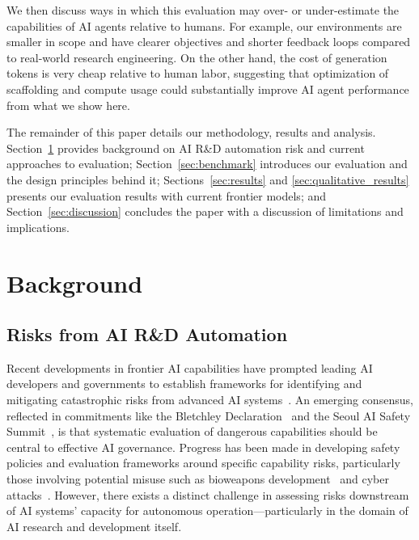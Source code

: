 \documentclass{article}
\begin{document}
We then discuss ways in which this evaluation may over- or under-estimate the capabilities of AI agents relative to humans. For example, our environments are smaller in scope and have clearer objectives and shorter feedback loops compared to real-world research engineering. On the other hand, the cost of generation tokens is very cheap relative to human labor, suggesting that optimization of scaffolding and compute usage could substantially improve AI agent performance from what we show here.


The remainder of this paper details our methodology, results and analysis. Section~\ref{sec:background} provides background on AI R\&D automation risk and current approaches to evaluation; Section~\ref{sec:benchmark} introduces our evaluation and the design principles behind it; Sections~\ref{sec:results} and  \ref{sec:qualitative_results} presents our evaluation results with current frontier models; and Section~\ref{sec:discussion} concludes the paper with a discussion of limitations and implications. 

\section{Background}
\label{sec:background}

\subsection{Risks from AI R\&D Automation}
\label{subsec:risks}

Recent developments in frontier AI capabilities have prompted leading AI developers and governments to establish frameworks for identifying and mitigating catastrophic risks from advanced AI systems~\cite{anthropic2024rsp,deepmind2024frontier,openai2023preparedness}. 
An emerging consensus, reflected in commitments like the Bletchley Declaration~\cite{bletchley2023} and the Seoul AI Safety Summit~\cite{UK_GOV_Frontier_AI_Safety_2024}, is that systematic evaluation of dangerous capabilities should be central to effective AI governance. 
Progress has been made in developing safety policies and evaluation frameworks around specific capability risks, particularly those involving potential misuse such as bioweapons development~\cite{openai2024earlywarning} and cyber attacks~\cite{wan2024cyberseceval3advancingevaluation}. However, there exists a distinct challenge in assessing risks downstream of AI systems’ capacity for autonomous operation—particularly
in the domain of AI research and development itself.
\end{document}

